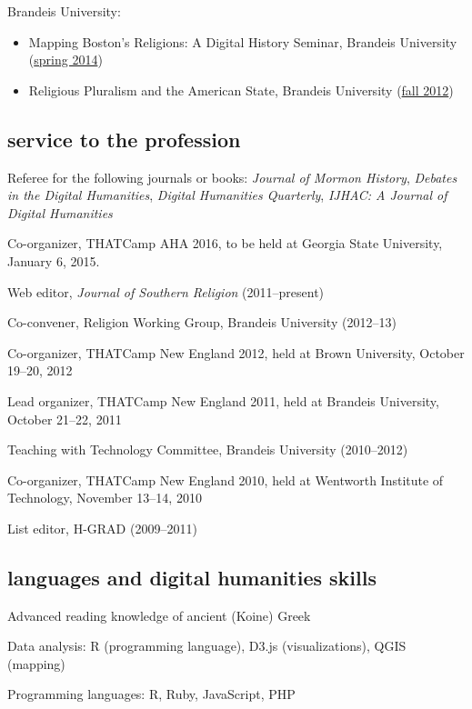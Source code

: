 \documentclass[11pt]{article}
\providecommand{\tightlist}{%
  \setlength{\itemsep}{0pt}\setlength{\parskip}{0pt}}
\begin{document}
Brandeis University:

\begin{itemize}
    \tightlist
  \item
    Mapping Boston's Religions: A Digital History Seminar, Brandeis
    University (\href{/downloads/pdf/religion-19c-dh.pdf}{spring 2014})
  \item
    Religious Pluralism and the American State, Brandeis University
    (\href{/downloads/pdf/religious-pluralism.syllabus.2012-fall.pdf}{fall
      2012})
\end{itemize}

\subsection{service to the profession}\label{service}

Referee for the following journals or books: \emph{Journal of Mormon History}, 
\emph{Debates in the Digital Humanities}, \emph{Digital Humanities Quarterly}, 
\emph{IJHAC: A Journal of Digital Humanities}

Co-organizer, THATCamp AHA 2016, to be held at Georgia State University,
January 6, 2015.

Web editor, \emph{Journal of Southern Religion} (2011--present)

Co-convener, Religion Working Group, Brandeis University (2012--13)

Co-organizer, THATCamp New England 2012, held at Brown University,
October 19--20, 2012

Lead organizer, THATCamp New England 2011, held at Brandeis University,
October 21--22, 2011

Teaching with Technology Committee, Brandeis University (2010--2012)

Co-organizer, THATCamp New England 2010, held at Wentworth Institute of
Technology, November 13--14, 2010

List editor, H-GRAD (2009--2011)

\subsection{languages and digital humanities
  skills}\label{languages-and-digital-humanities-skills}

Advanced reading knowledge of ancient (Koine) Greek

Data analysis: R (programming language), D3.js (visualizations), QGIS
(mapping)

Programming languages: R, Ruby, JavaScript, PHP
\end{document}
